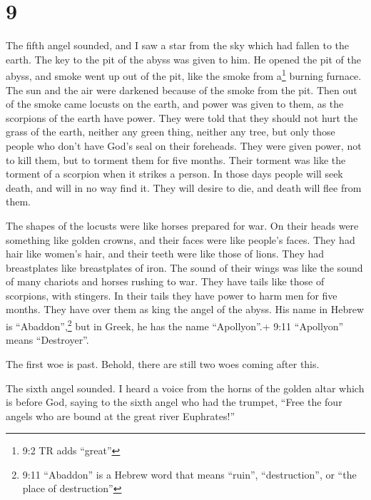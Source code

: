 \hypertarget{section-8}{%
\section{9}\label{section-8}}

 The fifth angel sounded, and I saw a star from the sky
which had fallen to the earth. The key to the pit of the abyss was given
to him.  He opened the pit of the abyss, and smoke went up
out of the pit, like the smoke from a\footnote{9:2 TR adds ``great''}
burning furnace. The sun and the air were darkened because of the smoke
from the pit.  Then out of the smoke came locusts on the
earth, and power was given to them, as the scorpions of the earth have
power.  They were told that they should not hurt the grass
of the earth, neither any green thing, neither any tree, but only those
people who don't have God's seal on their foreheads.  They
were given power, not to kill them, but to torment them for five months.
Their torment was like the torment of a scorpion when it strikes a
person.  In those days people will seek death, and will in
no way find it. They will desire to die, and death will flee from them.

 The shapes of the locusts were like horses prepared for
war. On their heads were something like golden crowns, and their faces
were like people's faces.  They had hair like women's hair,
and their teeth were like those of lions.  They had
breastplates like breastplates of iron. The sound of their wings was
like the sound of many chariots and horses rushing to war. 
They have tails like those of scorpions, with stingers. In their tails
they have power to harm men for five months.  They have
over them as king the angel of the abyss. His name in Hebrew is
``Abaddon'',\footnote{9:11 ``Abaddon'' is a Hebrew word that means
  ``ruin'', ``destruction'', or ``the place of destruction''} but in
Greek, he has the name ``Apollyon''.+ 9:11 ``Apollyon'' means
``Destroyer''.

 The first woe is past. Behold, there are still two woes
coming after this.

 The sixth angel sounded. I heard a voice from the horns of
the golden altar which is before God,  saying to the sixth
angel who had the trumpet, ``Free the four angels who are bound at the
great river Euphrates!''

